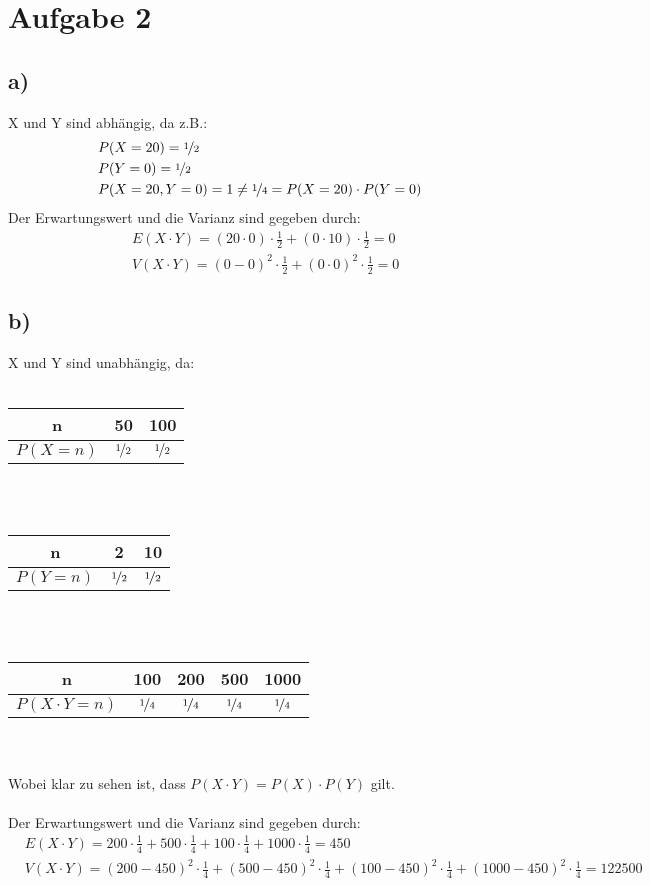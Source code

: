\section*{Aufgabe 2}
\subsection*{a)}
X und Y sind abhängig, da z.B.:
\begin{align*}
&P(X=20) = \nicefrac{1}{2}\\
&P(Y=0) = \nicefrac{1}{2}\\
&P(X=20, Y=0) = 1 \neq \nicefrac{1}{4} = P(X=20)\cdot P(Y=0)
\end{align*}
Der Erwartungswert und die Varianz sind gegeben durch:
\begin{align*}
&E(X\cdot Y) = (20\cdot0)\cdot \frac{ 1 }{ 2 } + (0\cdot10)\cdot \frac{ 1 }{ 2 } = 0\\
&V(X\cdot Y) = (0-0)^2\cdot \frac{ 1 }{ 2 } + (0\cdot0)^2\cdot \frac{ 1 }{ 2 } = 0
\end{align*}
\subsection*{b)}
X und Y sind unabhängig, da:\\\\
\begin{tabular}{ c | c | c }
  n & 50 & 100\\
  \hline
  $ P(X = n) $ & $ \nicefrac{1}{2} $ & $ \nicefrac{1}{2} $ \\
\end{tabular}\\\\
\begin{tabular}{ c | c | c }
  n & 2 & 10\\
  \hline
  $ P(Y = n) $ & $ \nicefrac{1}{2} $ & $ \nicefrac{1}{2} $ \\
\end{tabular}\\\\
\begin{tabular}{ c | c | c | c | c }
  n & 100 & 200 & 500 & 1000\\
  \hline
  $ P(X\cdot Y = n) $ & $ \nicefrac{1}{4} $ & $ \nicefrac{1}{4} $& $ \nicefrac{1}{4} $& $ \nicefrac{1}{4} $ \\
\end{tabular}\\\\
Wobei klar zu sehen ist, dass $ P(X\cdot Y) = P(X)\cdot P(Y) $ gilt.\\\\
Der Erwartungswert und die Varianz sind gegeben durch:
\begin{align*}
&E(X\cdot Y) = 200 \cdot \frac{ 1 }{ 4 } + 500 \cdot \frac{ 1 }{ 4 } + 100 \cdot \frac{ 1 }{ 4 } + 1000 \cdot \frac{ 1 }{ 4 } = 450 \\
&V(X\cdot Y) = (200-450)^2\cdot \frac{ 1 }{ 4 } + (500-450)^2\cdot \frac{ 1 }{ 4 } + (100-450)^2\cdot \frac{ 1 }{ 4 } + (1000-450)^2\cdot \frac{ 1 }{ 4 } = 122500
\end{align*}

